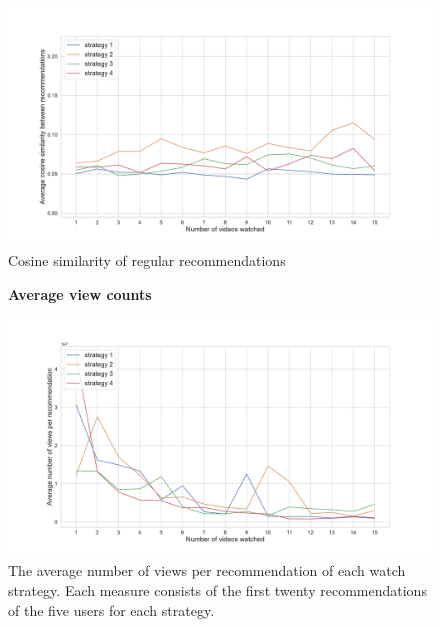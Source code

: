 \begin{appendices}
\begin{figure}
\centering
\includegraphics[width=\textwidth]{images/Reg sim.pdf}
\caption{Cosine similarity of regular recommendations}
\label{appendix:reg_sim}
\end{figure}

\begin{figure}
  \textbf{Average view counts}\par\medskip
  \centering
  \includegraphics[keepaspectratio, width=\textwidth]{images/views.pdf}
  \caption{The average number of views per recommendation of each watch strategy. Each measure consists of the first twenty recommendations of the five users for each strategy.}
  \label{appendix:views}
\end{figure}



\end{appendices}
